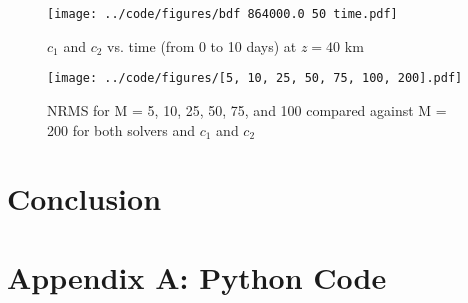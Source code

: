 \documentclass[twocolumn,10pt]{asme2ej}
\begin{document}
\begin{figure}[thb]
\begin{center}
\texttt{[image: ../code/figures/bdf 864000.0 50 time.pdf]}
\caption{$c_1$ and $c_2$ vs. time (from 0 to 10 days) at $z = 40$ km}
\label{40km_plot}
\end{center}
\end{figure}

\begin{figure}[thb]
\begin{center}
\texttt{[image: ../code/figures/[5, 10, 25, 50, 75, 100, 200].pdf]}
\caption{NRMS for M = 5, 10, 25, 50, 75, and 100 compared against M = 200 for both solvers and $c_1$ and $c_2$}
\label{NRMS_plot}
\end{center}
\end{figure}

\section{Conclusion}

\nocite{*}



\clearpage
\onecolumn
\appendix       %
\section*{Appendix A: Python Code}




\end{document}
